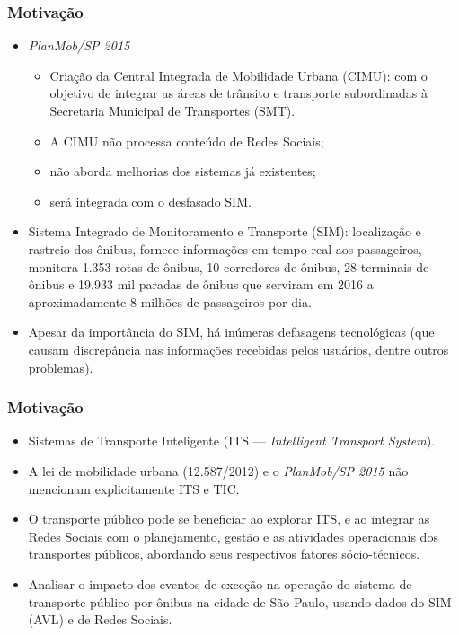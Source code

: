 \documentclass{beamer}
\begin{document}
\begin{frame}
\frametitle{Motivação}
\begin{itemize}
\item \textit{PlanMob/SP 2015}
\begin{itemize}
\item Criação da Central Integrada de Mobilidade Urbana (CIMU): com o objetivo de integrar as áreas de trânsito e transporte subordinadas à Secretaria Municipal de Transportes (SMT).
\item A CIMU não processa conteúdo de Redes Sociais;
\item não aborda melhorias dos sistemas já existentes;
\item será integrada com o desfasado SIM.
\end{itemize}
\end{itemize}

\begin{itemize}
\item Sistema Integrado de Monitoramento e Transporte (SIM): localização e rastreio dos ônibus, fornece informações em tempo real aos passageiros, monitora 1.353 rotas de ônibus, 10 corredores de ônibus, 28 terminais de ônibus e 19.933 mil paradas de ônibus que serviram em 2016 a aproximadamente 8 milhões de passageiros por dia. \item Apesar da importância do SIM, há inúmeras defasagens tecnológicas (que causam discrepância nas informações recebidas pelos usuários, dentre outros problemas).
\end{itemize}
\end{frame}
\begin{frame}
\frametitle{Motivação}
\begin{itemize}
\item Sistemas de Transporte Inteligente (ITS --- \textit{Intelligent Transport System}).
\item A lei de mobilidade urbana (12.587/2012) e o \textit{PlanMob/SP 2015} não mencionam explicitamente ITS e TIC.
\item O transporte público pode se beneficiar ao explorar ITS, e ao integrar as Redes Sociais com o planejamento, gestão e as atividades operacionais dos transportes públicos, abordando seus respectivos fatores sócio-técnicos.
\item Analisar o impacto dos eventos de exceção na operação do sistema de transporte público por ônibus na cidade de São Paulo, usando dados do SIM (AVL) e de Redes Sociais.
\end{itemize}
\end{frame}
\end{document}

